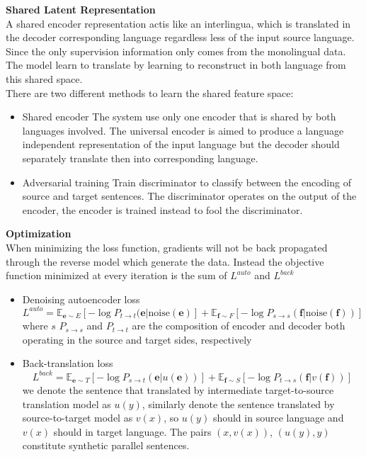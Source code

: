 \textbf{Shared Latent Representation} \\
A shared encoder representation actis like an interlingua, which is translated in the decoder corresponding language regardless less of the input source language. Since the only supervision information only comes from the monolingual data. The model learn to translate by learning to reconstruct in both language from this shared space.\\
There are two different methods to learn the shared feature space:
\begin{itemize}
	\item Shared encoder
	The system use only one encoder that is shared by both languages involved. The universal encoder is aimed to produce a language independent representation of the input language but the decoder should separately translate then into corresponding language.
	\item Adversarial training
	Train discriminator to classify between the encoding of source and target sentences. The discriminator operates on the output of the encoder, the encoder is trained instead to fool the discriminator. 
\end{itemize}


\textbf{Optimization}\\
When minimizing the loss function, gradients will not be back propagated through the reverse model which generate the data. Instead the objective function minimized at every iteration is the sum of $L^{auto}$ and $L^{back}$
\begin{itemize}
	\item Denoising autoencoder loss
	\[ L^{auto} = \mathbb{E}_{\bm{e}\sim E}[-\log P_{t\rightarrow t}(\bm{e}|\text{noise}(\bm{e})] + \mathbb{E}_{\bm{f}\sim F} [-\log P_{s\rightarrow s}(\bm{f}|\text{noise}(\bm{f}))]\]
	where $s$ $P_{s\rightarrow s}$ and $P_{t\rightarrow t}$ are the composition of encoder and decoder both operating in the source and target sides, respectively
	\item Back-translation loss
	\[ L^{back} = \mathbb{E}_{\bm{e}\sim T} [-\log P_{s\rightarrow t}(\bm{e}|u(\bm{e}))] +  \mathbb{E}_{\bm{f}\sim S} [-\log P_{t\rightarrow s}(\bm{f}|v(\bm{f}))]\]
	 we denote the sentence that translated by intermediate target-to-source translation model as $u(y)$, similarly denote the sentence translated by source-to-target model as $v(x)$, so $u(y)$ should in source language and $v(x)$ should in target language. The pairs $(x, v(x))$, $(u(y), y)$ constitute synthetic parallel  sentences.
\end{itemize}










